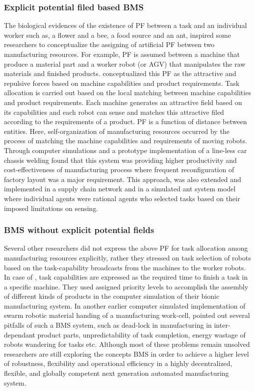 \subsubsection*{Explicit potential filed based BMS}
The biological evidences of the existence of PF between a task and an individual worker such as, a flower and a bee, a food source and an ant,  inspired some researchers to conceptualize the assigning of artificial PF between two manufacturing resources. For example, PF is assumed between a machine that produce a material part and a worker robot (or AGV) that manipulates the raw materials and finished products. \cite{Ueda2006} conceptualized this PF as the attractive and repulsive forces based on machine capabilities and product requirements. Task allocation is carried out based on the local matching between machine capabilities and product requirements. Each machine generates an attractive field based on its capabilities and each robot can sense and matches this attractive filed according to the requirements of a product. PF is a function of distance between entities. Here, self-organization of manufacturing resources occurred by the process of matching the machine capabilities and requirements of moving robots.  Through computer simulations and a prototype implementation of a line-less car chassis welding \cite{Ueda2006} found that this system was providing higher productivity and cost-effectiveness of manufacturing process where frequent reconfiguration of factory layout was a major requirement. This approach, was also extended and implemented in a supply chain network and in a simulated ant system model where individual agents were rational agents who selected tasks based on their imposed limitations on sensing. 
\subsubsection*{BMS without explicit potential fields}
Several other researchers did not express the above PF for task allocation among manufacturing resources explicitly, rather they stressed on task selection of robots based on the task-capability broadcasts from the machines to the worker robots. In case of \cite{Lazinica+2007}, task capabilities are expressed as the required time to finish a task in a specific machine. They used assigned priority levels to accomplish the assembly of different kinds of products in the computer simulation of their bionic manufacturing system. In another earlier computer simulated implementation of swarm robotic material handing of a manufacturing work-cell, \cite{Doty+1993} pointed out several pitfalls of such a BMS system, such as dead-lock in manufacturing in inter-dependant product parts, unpredictability of task completion, energy wastage of robots wandering for tasks etc. Although most of these problems remain unsolved researchers are still exploring the concepts BMS in order to achieve a higher level of robustness, flexibility and operational efficiency in a highly decentralized, flexible, and  globally competent next generation automated manufacturing system.